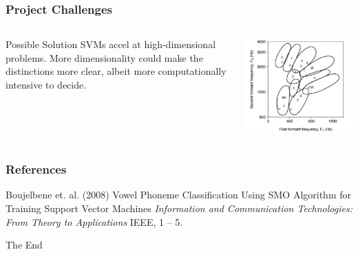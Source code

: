 \documentclass{beamer}
\begin{document}
\begin{frame}
\frametitle{Project Challenges}

\begin{columns}[c]


\begin{block}{Possible Solution}
SVMs accel at high-dimensional problems. More dimensionality could make the distinctions more clear, albeit more computationally intensive to decide. 
\end{block}


\includegraphics[scale=.45]{../figures/vowelchart.jpg}

\end{columns}

\end{frame}


\begin{frame}
\frametitle{References}
\footnotesize{
\begin{thebibliography}{99} %
 Boujelbene et. al. (2008)
\newblock Vowel Phoneme Classification Using SMO Algorithm for Training Support Vector 
Machines 
\newblock \emph{Information and Communication Technologies: From Theory to Applications} IEEE, 1 -- 5.
\end{thebibliography}
}
\end{frame}


\begin{frame}
\Huge{\centerline{The End}}
\end{frame}

\end{document}
